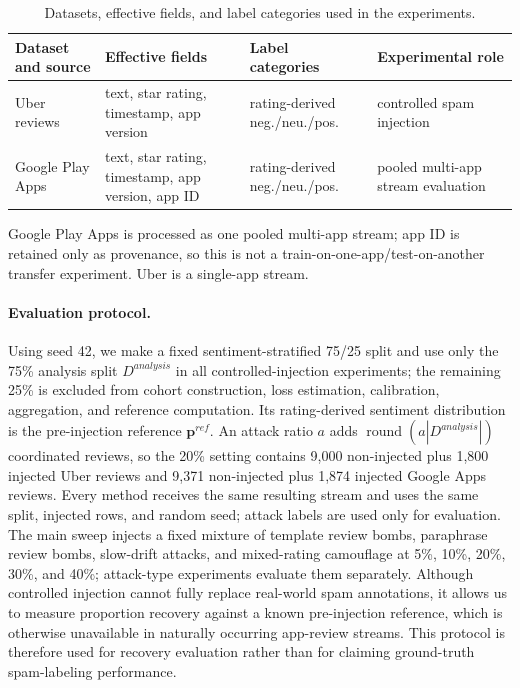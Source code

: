\documentclass[runningheads]{llncs}
\begin{document}
\begin{table}
\centering
\small
\setlength{\tabcolsep}{3.5pt}
\caption{Datasets, effective fields, and label categories used in the experiments.}
\label{tab:data_profile}
\begin{tabular}{@{}>{\raggedright\arraybackslash}p{2.5cm}>{\raggedright\arraybackslash}p{3.9cm}>{\raggedright\arraybackslash}p{2.4cm}>{\raggedright\arraybackslash}p{2.6cm}@{}}
\toprule
Dataset and source & Effective fields & Label categories & Experimental role\\
\midrule
Uber reviews \cite{kaggleUberReviews} & text, star rating, timestamp, app version & rating-derived neg./neu./pos. & controlled spam injection\\
Google Play Apps \cite{kaggleGooglePlayApps} & text, star rating, timestamp, app version, app ID & rating-derived neg./neu./pos. & pooled multi-app stream evaluation\\
\bottomrule
\end{tabular}
\end{table}

Google Play Apps is processed as one pooled multi-app stream; app ID is retained only as provenance, so this is not a train-on-one-app/test-on-another transfer experiment. Uber is a single-app stream.

\paragraph{Evaluation protocol.}
Using seed 42, we make a fixed sentiment-stratified 75/25 split and use only the 75\% analysis split \(D^{analysis}\) in all controlled-injection experiments; the remaining 25\% is excluded from cohort construction, loss estimation, calibration, aggregation, and reference computation. Its rating-derived sentiment distribution is the pre-injection reference \(\mathbf{p}^{ref}\). An attack ratio \(a\) adds \(\operatorname{round}(a|D^{analysis}|)\) coordinated reviews, so the 20\% setting contains 9,000 non-injected plus 1,800 injected Uber reviews and 9,371 non-injected plus 1,874 injected Google Apps reviews. Every method receives the same resulting stream and uses the same split, injected rows, and random seed; attack labels are used only for evaluation. The main sweep injects a fixed mixture of template review bombs, paraphrase review bombs, slow-drift attacks, and mixed-rating camouflage at 5\%, 10\%, 20\%, 30\%, and 40\%; attack-type experiments evaluate them separately. Although controlled injection cannot fully replace real-world spam annotations, it allows us to measure proportion recovery against a known pre-injection reference, which is otherwise unavailable in naturally occurring app-review streams. This protocol is therefore used for recovery evaluation rather than for claiming ground-truth spam-labeling performance.
\end{document}
